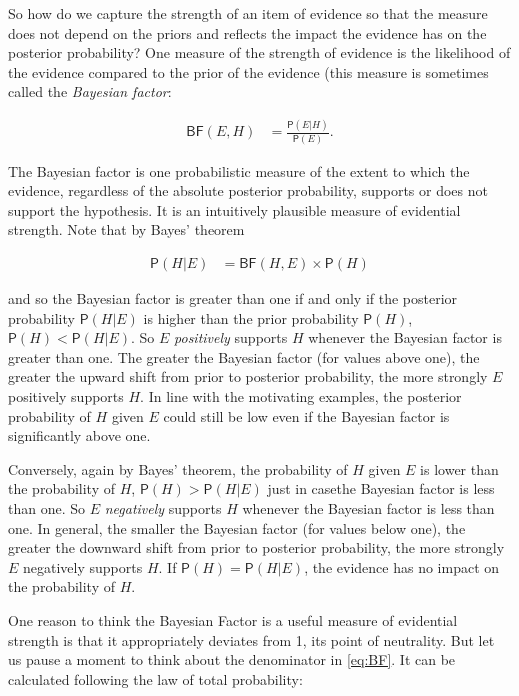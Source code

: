 \documentclass[10pt,dvipsnames,enabledeprecatedfontcommands]{scrartcl}
\newcommand{\pr}[1]{\mathsf{P}(#1)}
\begin{document}
So how do we capture the strength of an item of evidence so that the
measure does not depend on the priors and reflects the impact the
evidence has on the posterior probability? One measure of the strength
of evidence is the likelihood of the evidence compared to the prior of
the evidence (this measure is sometimes called the
\emph{Bayesian factor}:

\begin{align}\label{eq:BF}
\mathsf{BF}(E,H) & = \frac{\pr{E \vert H}}{\pr{E}}.
\end{align}

\noindent The Bayesian factor is one probabilistic measure of the extent
to which the evidence, regardless of the absolute posterior probability,
supports or does not support the hypothesis. It is an intuitively
plausible measure of evidential strength. Note that by Bayes' theorem

\vspace{-3mm}

\begin{align*}
\pr{H \vert E} & = \mathsf{BF}(H, E) \times \pr{H}
\end{align*}

\noindent and so the Bayesian factor is greater than one if and only if
the posterior probability \(\pr{H \vert E}\) is higher than the prior
probability \(\pr{H}\), \(\pr{H}<\pr{H\vert E}\). So \(E\)
\textit{positively} supports \(H\) whenever the Bayesian factor is
greater than one. The greater the Bayesian factor (for values above
one), the greater the upward shift from prior to posterior probability,
the more strongly \(E\) positively supports \(H\). In line with the
motivating examples, the posterior probability of \(H\) given \(E\)
could still be low even if the Bayesian factor is significantly above
one.

Conversely, again by Bayes' theorem, the probability of \(H\) given
\(E\) is lower than the probability of \(H\), \(\pr{H}>\pr{H\vert E}\)
just in casethe Bayesian factor is less than one. So \(E\)
\textit{negatively} supports \(H\) whenever the Bayesian factor is less
than one. In general, the smaller the Bayesian factor (for values below
one), the greater the downward shift from prior to posterior
probability, the more strongly \(E\) negatively supports \(H\). If
\(\pr{H}=\pr{H\vert E}\), the evidence has no impact on the probability
of \(H\).

One reason to think the Bayesian Factor is a useful measure of
evidential strength is that it appropriately deviates from 1, its point
of neutrality. But let us pause a moment to think about the denominator
in \eqref{eq:BF}. It can be calculated following the law of total
probability:
\end{document}
